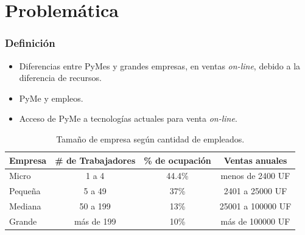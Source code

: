 \documentclass[10pt, compress]{beamer}
\begin{document}
\section{Problemática}
\begin{frame}
\frametitle{Definición}
        \begin{itemize}
          \item Diferencias entre PyMes y grandes empresas, en ventas \emph{on-line}, debido a la diferencia de recursos.
	  \item PyMe y empleos.
	  \item Acceso de PyMe a tecnologías actuales para venta \emph{on-line}.
        \end{itemize}

\begin{table}[h]
\footnotesize
\centering
\begin{tabular}{|l|c|c|c|}
\hline
{\bf Empresa}  & {\bf \# de Trabajadores} & {\bf \% de ocupación} & {\bf Ventas anuales}\\
\hline
Micro    & 1 a 4                & 44.4\%  & menos de 2400 UF\\
\hline
Pequeña  & 5 a 49               & 37\%  & 2401 a 25000 UF\\
\hline
Mediana  & 50 a 199             & 13\%  & 25001 a 100000 UF\\
\hline
Grande   & más de 199           & 10\%  & más de 100000 UF\\
\hline
\end{tabular}
\caption{Tamaño de empresa según cantidad de empleados.}
\label{tab:tam_empresa}
\end{table}
\end{frame}
\end{document}
